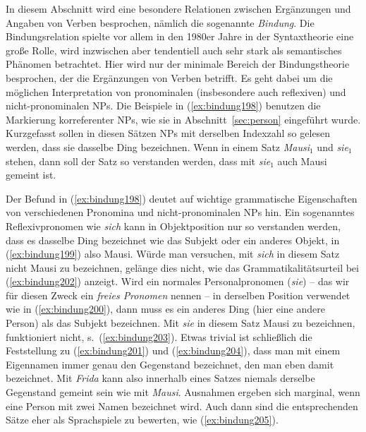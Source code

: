 In diesem Abschnitt wird eine besondere Relationen zwischen Ergänzungen und Angaben von Verben besprochen, nämlich die sogenannte \textit{Bindung}.
Die Bindungsrelation spielte vor allem in den 1980er Jahre in der Syntaxtheorie eine große Rolle, wird inzwischen aber tendentiell auch sehr stark als semantisches Phänomen betrachtet.
Hier wird nur der minimale Bereich der Bindungstheorie besprochen, der die Ergänzungen von Verben betrifft.
Es geht dabei um die möglichen Interpretation von pronominalen (insbesondere auch reflexiven) und nicht-pronominalen NPs.
Die Beispiele in (\ref{ex:bindung198}) benutzen die Markierung korreferenter NPs, wie sie in Abschnitt~\ref{sec:person} eingeführt wurde.
Kurzgefasst sollen in diesen Sätzen NPs mit derselben Indexzahl so gelesen werden, dass sie dasselbe Ding bezeichnen.
Wenn in einem Satz \textit{Mausi$_1$} und \textit{sie$_1$} stehen, dann soll der Satz so verstanden werden, dass mit \textit{sie$_1$} auch Mausi gemeint ist.

\begin{exe}
  \ex\label{ex:bindung198}
  \begin{xlist}
  \end{xlist}
\end{exe}

Der Befund in (\ref{ex:bindung198}) deutet auf wichtige grammatische Eigenschaften von verschiedenen Pronomina und nicht-pronominalen NPs hin.
Ein sogenanntes Reflexivpronomen wie \textit{sich} kann in Objektposition nur so verstanden werden, dass es dasselbe Ding bezeichnet wie das Subjekt oder ein anderes Objekt, in (\ref{ex:bindung199}) also Mausi.
Würde man versuchen, mit \textit{sich} in diesem Satz nicht Mausi zu bezeichnen, gelänge dies nicht, wie das Grammatikalitätsurteil bei (\ref{ex:bindung202}) anzeigt.
Wird ein normales Personalpronomen (\textit{sie}) -- das wir für diesen Zweck ein \textit{freies Pronomen} nennen -- in derselben Position verwendet wie in (\ref{ex:bindung200}), dann muss es ein anderes Ding (hier eine andere Person) als das Subjekt bezeichnen.
Mit \textit{sie} in diesem Satz Mausi zu bezeichnen, funktioniert nicht, s.\ (\ref{ex:bindung203}).
Etwas trivial ist schließlich die Feststellung zu (\ref{ex:bindung201}) und (\ref{ex:bindung204}), dass man \zB mit einem Eigennamen immer genau den Gegenstand bezeichnet, den man eben damit bezeichnet.
Mit \textit{Frida} kann also innerhalb eines Satzes niemals derselbe Gegenstand gemeint sein wie mit \textit{Mausi}.
Ausnahmen ergeben sich marginal, wenn eine Person mit zwei Namen bezeichnet wird.
Auch dann sind die entsprechenden Sätze eher als Sprachspiele zu bewerten, wie \zB (\ref{ex:bindung205}).

